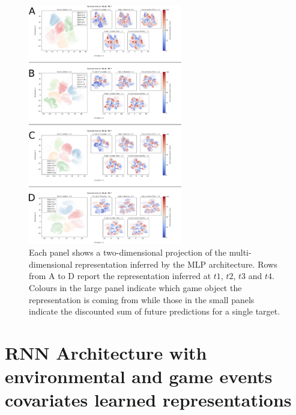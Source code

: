 \begin{figure}[!htb]
\includegraphics[width=0.6\textwidth]{images/appendix_D/mlp_beha_umap.png}
\centering
\caption[\textbf{Lower dimensional representation of the latent representations generated by the MLP architecture}]{Each panel shows a two-dimensional projection of the multi-dimensional representation inferred by the MLP architecture. Rows from A to D report the representation inferred at $t1$, $t2$, $t3$ and $t4$. Colours in the large panel indicate which game object the representation is coming from while those in the small panels indicate the discounted sum of future predictions for a single target.}
\end{figure}
\FloatBarrier

\section{RNN Architecture with environmental and game events covariates learned representations}
\label{rnn_env_even_architecture_representations}


